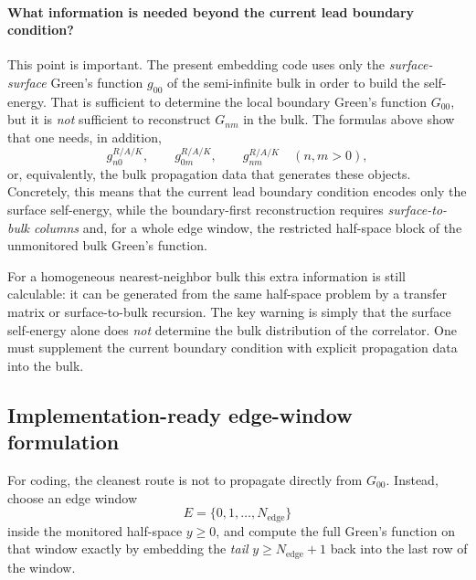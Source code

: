 \documentclass[11pt]{article}
\begin{document}
\paragraph{What information is needed beyond the current lead boundary condition?}

This point is important.  The present embedding code uses only the
\emph{surface-surface} Green's function \(g_{00}\) of the semi-infinite bulk in
order to build the self-energy.  That is sufficient to determine the local
boundary Green's function \(G_{00}\), but it is \emph{not} sufficient to
reconstruct \(G_{nm}\) in the bulk.  The formulas above show that one needs, in
addition,
\begin{equation}
  g_{n0}^{R/A/K},\qquad g_{0m}^{R/A/K},\qquad g_{nm}^{R/A/K}
  \quad (n,m>0),
\end{equation}
or, equivalently, the bulk propagation data that generates these objects.
Concretely, this means that the current lead boundary condition encodes only the
surface self-energy, while the boundary-first reconstruction requires
\emph{surface-to-bulk columns} and, for a whole edge window, the restricted
half-space block of the unmonitored bulk Green's function.

For a homogeneous nearest-neighbor bulk this extra information is still
calculable: it can be generated from the same half-space problem by a transfer
matrix or surface-to-bulk recursion.  The key warning is simply that the
surface self-energy alone does \emph{not} determine the bulk distribution of the
correlator.  One must supplement the current boundary condition with explicit
propagation data into the bulk.

\subsection*{Implementation-ready edge-window formulation}

For coding, the cleanest route is not to propagate directly from \(G_{00}\).
Instead, choose an edge window
\begin{equation}
  E=\{0,1,\dots,N_{\mathrm{edge}}\}
\end{equation}
inside the monitored half-space \(y\ge 0\), and compute the full Green's
function on that window exactly by embedding the \emph{tail} \(y\ge
N_{\mathrm{edge}}+1\) back into the last row of the window.
\end{document}
